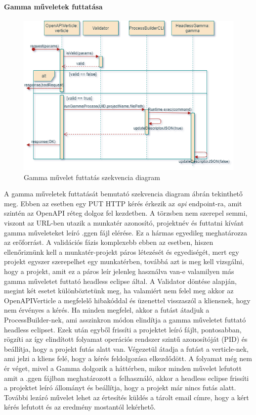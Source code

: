 \paragraph{Gamma műveletek futtatása}
\begin{figure}[!ht]
	\includegraphics[width=150mm, keepaspectratio]{figures/run_gamma_seq.png}
	\caption{Gamma művelet futtatás szekvencia diagram}
	\label{fig:rungamma}
\end{figure}
A gamma műveletek futtatását bemutató szekvencia diagram  ábrán tekinthető meg. Ebben az esetben egy PUT HTTP kérés érkezik az \textit{api} endpoint-ra, amit szintén az OpenAPI réteg dolgoz fel kezdetben. A törzsben nem szerepel semmi, viszont az URL-ben utazik a munkatér azonosító, projektnév és futtatni kívánt gamma műveleteket leíró .ggen fájl elérése. Ez a hármas egyedileg meghatározza az erőforrást. A validációs fázis komplexebb ebben az esetben, hiszen ellenőriznünk kell a munkatér-projekt páros létezését és egyediségét, mert egy projekt egyszer szerepelhet egy munkatérben, továbbá azt is meg kell vizsgálni, hogy a projekt, amit ez a páros leír jelenleg használva van-e valamilyen más gamma műveletet futtató headless eclipse által. A Validator döntése alapján, megint két esetet különböztetünk meg, ha valamiért nem felel meg akkor az OpenAPIVerticle a megfelelő hibakóddal és üzenettel visszaszól a kliensnek, hogy nem érvényes a kérés. Ha minden megfelel, akkor a futást átadjuk a ProcessBuilder-nek, ami asszinkron módon elindítja a gamma műveletet futtató headless eclipset. Ezek után egyből frissíti a projektet leíró fájlt, pontosabban, rögzíti az így elindított folyamat operációs rendszer szintű azonosítóját (PID) és beállítja, hogy a projekt futás alatt van. Végezetül átadja a futást a verticle-nek, ami jelzi a kliens felé, hogy a kérés feldolgozása elkezdődött.
A folyamat még nem ér véget, mivel a Gamma dolgozik a háttérben, mikor minden művelet lefutott amit a .ggen fájlban meghatározott a felhasználó, akkor a headless eclipse frissíti a projektet leíró állományt és beállítja, hogy a projekt már nincs futás alatt. További lezáró művelet lehet az értesítés küldés a tárolt email címre, hogy a kért kérés lefutott és az eredmény mostantól lekérhető.



